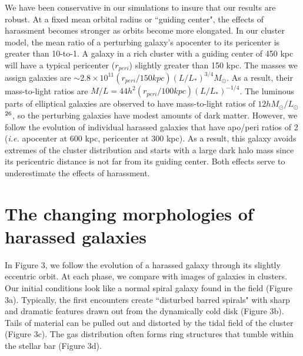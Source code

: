We have been conservative in our simulations to insure that our
results are robust.  At a fixed mean orbital radius or ``guiding
center", the effects of harassment becomes stronger as orbits become
more elongated.  In our cluster model, the mean ratio of a perturbing
galaxy's apocenter to its pericenter is greater than 10-to-1.
A galaxy in a rich cluster with a guiding center of 450 kpc will have a
typical pericenter ($r_{peri}$) slightly greater than 150 kpc.  The
masses we assign galaxies are $\sim 2.8\times10^{11} (r_{peri}/150kpc)
(L/L_*)^{3/4} M_\odot$.  As a result, their mass-to-light ratios are
$M/L = 44 h^2  (r_{peri}/100kpc)(L/L_*)^{-1/4}$.
The luminous parts of elliptical galaxies are observed to have
mass-to-light ratios of
$12  h M_\odot/L_\odot$$^{\bf\rm 26}$, so the perturbing galaxies have modest
amounts of dark matter.
However, we follow the evolution of individual
harassed galaxies that have apo/peri ratios of 2 ({\it i.e.} apocenter
at 600 kpc, pericenter at 300 kpc).  As a result, this galaxy avoids
extremes of the cluster distribution and starts with a large dark halo
mass since its pericentric distance is not far from its guiding
center.  Both effects serve to underestimate the effects of
harassment.


\section{The changing morphologies of harassed galaxies}

In Figure 3, we follow the evolution of a harassed galaxy through its
slightly eccentric orbit.  At each phase, we compare with images of
galaxies in clusters.
Our initial conditions look like a normal spiral galaxy found in the
field (Figure 3a).  Typically, the first encounters create ``disturbed
barred spirals" with sharp and dramatic features drawn out from the
dynamically cold disk (Figure 3b).  Tails of material can be pulled
out and distorted by the tidal field of the cluster (Figure 3c).  The
gas distribution often forms ring structures that tumble within the
stellar bar (Figure 3d).

\oneskip

